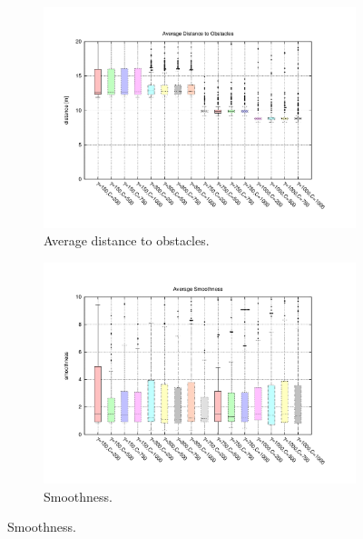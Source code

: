 \begin{figure}[h!]
  \centering
  \begin{subfigure}[b]{\textwidth}
	  \centering
	  \includegraphics[width=\textwidth, trim=55 50 85 60,clip]{figure8}
	  \caption{Average distance to obstacles.}
	  \label{fig:cp06_avg_dist_msvmpp}
  \end{subfigure}  

  \begin{subfigure}[b]{\textwidth}
	  \centering
	  \includegraphics[width=\textwidth, trim=55 50 85 60,clip]{figure9}
	  \caption{Smoothness.}
	  \label{fig:cp06_smoothness_msvmpp}
  \end{subfigure}        
\end{figure}

